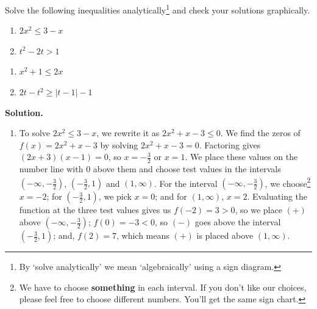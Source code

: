 \begin{ex}  Solve the following inequalities analytically\footnote{By `solve analytically' we mean `algebraically' using a sign diagram.} and check your solutions graphically.

\begin{multicols}{2}
\begin{enumerate}

\item  $2x^2 \leq 3-x$

\item  $t^2 - 2t > 1$

\setcounter{HW}{\value{enumi}}
\end{enumerate}
\end{multicols}

\begin{multicols}{2}
\begin{enumerate}
\setcounter{enumi}{\value{HW}}

\item  $x^2+1 \leq 2x$

\item  $2t-t^2 \geq |t-1|-1$

\end{enumerate}
\end{multicols}

{\bf Solution.}  

\begin{enumerate}

\item  To solve $2x^2 \leq 3-x$, we rewrite it as $2x^2+x-3 \leq 0$.  We find the zeros of $f(x) = 2x^2 + x - 3$ by solving $2x^2 + x - 3 = 0$.  Factoring gives $(2x+3)(x-1)=0$, so $x = -\frac{3}{2}$ or $x = 1$.  We place these values on the number line with $0$ above them and choose test values in the intervals $\left(-\infty, -\frac{3}{2}\right)$, $\left(-\frac{3}{2},1\right)$ and $(1,\infty)$.  For the interval  $\left(-\infty, -\frac{3}{2}\right)$, we choose\footnote{We have to choose \textbf{something} in each interval.  If you don't like our choices, please feel free to choose different numbers.  You'll get the same sign chart.} $x=-2$; for $\left(-\frac{3}{2},1\right)$, we pick $x=0$; and for $(1,\infty)$, $x=2$. Evaluating the function at the three test values gives us $f(-2) = 3 > 0$, so we place $(+)$ above $\left(-\infty, -\frac{3}{2}\right)$;  $f(0)=-3 < 0$, so $(-)$ goes above the interval $\left(-\frac{3}{2},1\right)$;  and, $f(2) = 7$, which means $(+)$ is placed above $(1,\infty)$.


\end{enumerate}
\end{ex}
